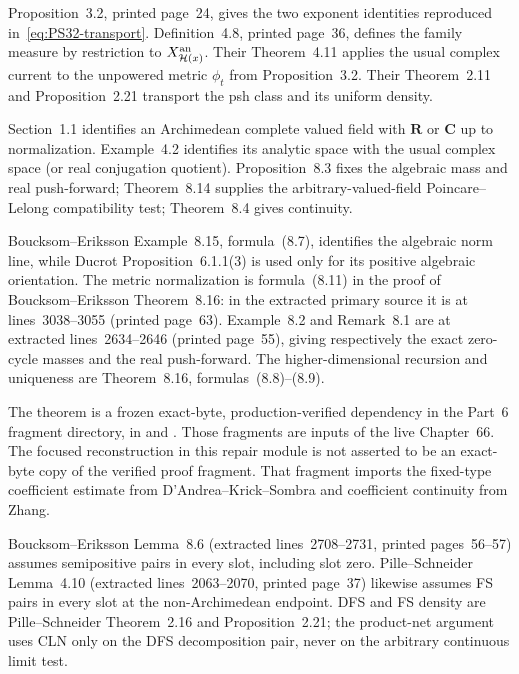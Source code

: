 \documentclass[11pt]{article}
\newcommand{\R}{\mathbf R}
\newcommand{\C}{\mathbf C}
\begin{document}
\begin{description}[style=nextline]
\item[Pille--Schneider convention.]
Proposition~3.2, printed page~24, gives the two exponent identities reproduced
in~\eqref{eq:PS32-transport}.  Definition~4.8, printed page~36, defines the
family measure by restriction to $X_{\mathcal H(x)}^{\rm an}$.  Their
Theorem~4.11 applies the usual complex current to the unpowered metric
$\phi_t$ from Proposition~3.2.  Their Theorem~2.11 and Proposition~2.21
transport the psh class and its uniform density.
\item[Boucksom--Eriksson normalization.]
Section~1.1 identifies an Archimedean complete valued field with $\R$ or
$\C$ up to normalization.  Example~4.2 identifies its analytic space with
the usual complex space (or real conjugation quotient).  Proposition~8.3
fixes the algebraic mass and real push-forward; Theorem~8.14 supplies the
arbitrary-valued-field Poincare--Lelong compatibility test; Theorem~8.4 gives
continuity.
\item[PN2 and the dimension-zero metric.]
Boucksom--Eriksson Example~8.15, formula~(8.7), identifies the algebraic
norm line, while Ducrot Proposition~6.1.1(3) is used only for its positive
algebraic orientation.  The metric normalization is formula~(8.11) in the
proof of Boucksom--Eriksson Theorem~8.16: in the extracted primary source it
is at lines~3038--3055 (printed page~63).  Example~8.2 and Remark~8.1 are at
extracted lines~2634--2646 (printed page~55), giving respectively the exact
zero-cycle masses and the real push-forward.  The higher-dimensional
recursion and uniqueness are Theorem~8.16, formulas~(8.8)--(8.9).
\item[Weighted Philippon--Gauss.]
The theorem is a frozen exact-byte, production-verified dependency in the
Part~6 fragment directory, in
 and
.
Those fragments are inputs of the live Chapter~66.  The focused
reconstruction in this repair module is not asserted to be an exact-byte copy
of the verified proof fragment.  That fragment imports the fixed-type
coefficient estimate from D'Andrea--Krick--Sombra and coefficient continuity
from Zhang.
\item[CLN and density.]
Boucksom--Eriksson Lemma~8.6 (extracted lines~2708--2731, printed
pages~56--57) assumes semipositive pairs in every slot, including slot zero.
Pille--Schneider Lemma~4.10 (extracted lines~2063--2070, printed page~37)
likewise assumes FS pairs in every slot at the non-Archimedean endpoint.
DFS and FS density are Pille--Schneider Theorem~2.16 and
Proposition~2.21; the product-net argument uses CLN only on the DFS
decomposition pair, never on the arbitrary continuous limit test.
\end{description}
\end{document}
